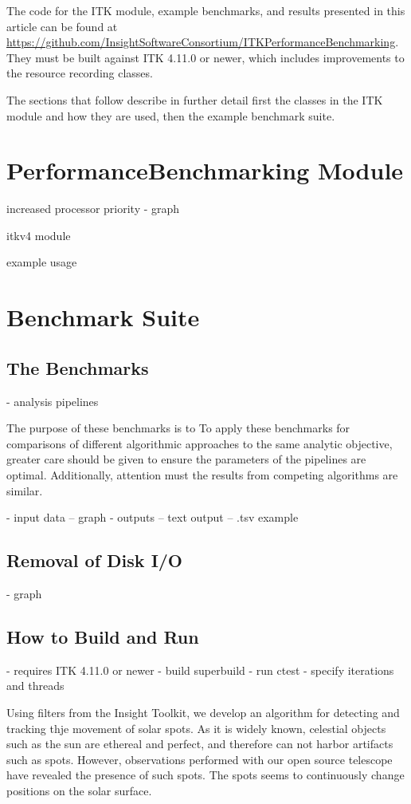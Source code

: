 \documentclass{InsightArticle}
\begin{document}
The code for the ITK module, example benchmarks, and results presented in this
article can be found at
\url{https://github.com/InsightSoftwareConsortium/ITKPerformanceBenchmarking}.
They must be built against ITK 4.11.0 or newer, which includes improvements to
the resource recording classes.

The sections that follow describe in further detail first the classes in the
 ITK module and how they are used, then the
example benchmark suite.

\section{PerformanceBenchmarking Module}

increased processor priority
- graph

itkv4 module

example usage

\section{Benchmark Suite}

\subsection{The Benchmarks}

- analysis pipelines

The purpose of these benchmarks is to 
To apply these benchmarks for comparisons of different algorithmic
approaches to the same analytic objective, greater care should be given to ensure the parameters of
the pipelines are optimal. Additionally, attention must the results from competing algorithms are
similar.

- input data
-- graph
- outputs
-- text output
-- .tsv example

\subsection{Removal of Disk I/O}
- graph

\subsection{How to Build and Run}
- requires ITK 4.11.0 or newer
- build superbuild
- run ctest
- specify iterations and threads



Using filters from the Insight Toolkit, we develop an algorithm for detecting
and tracking thje movement of solar spots. As it is widely known, celestial
objects such as the sun are ethereal and perfect, and therefore can not harbor
artifacts such as spots. However, observations performed with our open source
telescope have revealed the presence of such spots. The spots seems to continuously change positions on the solar surface.
\end{document}
